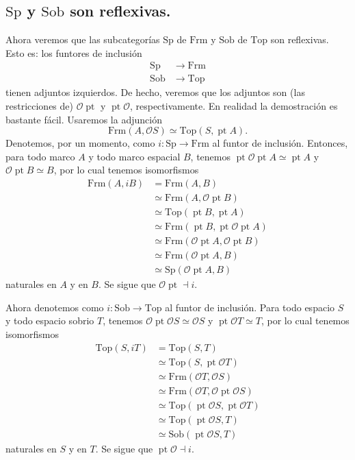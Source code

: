 \documentclass[12pt,letterpaper,titlepage]{article}
\theoremstyle{definition}
\renewcommand\cal[1]{\mathcal{#1}}
\newcommand\tps[2]{\texorpdfstring{#1}{#2}}
\newcommand\<{\langle}
\renewcommand\>{\rangle}
\newcommand{\Frm}{\mathrm{Frm}}
\newcommand{\Top}{\mathrm{Top}}
\newcommand{\Sp}{\mathrm{Sp}}
\newcommand{\Sob}{\mathrm{Sob}}
\DeclareMathOperator{\pt}{pt}
\begin{document}
\subsection{\tps{$\Sp$}{Sp} y \tps{$\Sob$}{Sob} son reflexivas.}
Ahora veremos que las subcategorías $\Sp$ de $\Frm$ y
$\Sob$ de $\Top$ son reflexivas.
Esto es: los funtores de inclusión
\begin{align*}
    \Sp&\to\Frm \\
    \Sob&\to\Top
\end{align*}
tienen adjuntos izquierdos.
De hecho, veremos que los adjuntos son (las restricciones de)
$\cal O\pt$ y $\pt\cal O$, respectivamente.
En realidad la demostración es bastante fácil.
Usaremos la adjunción
\[
    \Frm(A,\cal OS) \simeq \Top(S,\pt A).
\]
Denotemos, por un momento, como $i:\Sp\to\Frm$ al funtor
de inclusión.
Entonces, para todo marco $A$ y todo marco espacial $B$, tenemos
$\pt\cal O\pt A\simeq\pt A$ y $\cal O\pt B\simeq B$, por lo cual
tenemos isomorfismos
\begin{align*}
    \Frm(A,iB)
    &=\Frm(A,B) \\
    &\simeq \Frm(A,\cal O\pt B) \\
    &\simeq \Top(\pt B,\pt A) \\
    &\simeq \Frm(\pt B,\pt\cal O\pt A) \\
    &\simeq \Frm(\cal O\pt A,\cal O\pt B) \\
    &\simeq \Frm(\cal O\pt A,B) \\
    &\simeq \Sp(\cal O\pt A,B)
\end{align*}
naturales en $A$ y en $B$.
Se sigue que $\cal O\pt\dashv i$.

Ahora denotemos como $i:\Sob\to\Top$ al funtor de inclusión.
Para todo espacio $S$ y todo espacio sobrio $T$,
tenemos $\cal O\pt\cal OS\simeq\cal OS$ y $\pt\cal O T\simeq T$,
por lo cual tenemos isomorfismos
\begin{align*}
    \Top(S,iT)
    &= \Top(S,T) \\
    &\simeq \Top(S,\pt\cal OT) \\
    &\simeq \Frm(\cal OT,\cal OS) \\
    &\simeq \Frm(\cal OT,\cal O\pt\cal OS) \\
    &\simeq \Top(\pt\cal OS,\pt\cal OT) \\
    &\simeq \Top(\pt\cal OS,T) \\
    &\simeq \Sob(\pt\cal OS,T)
\end{align*}
naturales en $S$ y en $T$.
Se sigue que $\pt\cal O\dashv i$.
\end{document}
